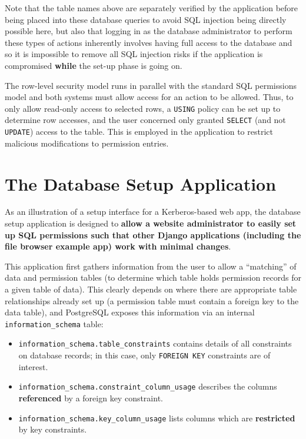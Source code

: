 \documentclass[12pt]{report}
\begin{document}
Note that the table names above are separately verified by the application before being placed into these database queries to avoid SQL injection being directly possible here, but also that logging in as the database administrator to perform these types of actions inherently involves having full access to the database and so it is impossible to remove all SQL injection risks if the application is compromised \textbf{while} the set-up phase is going on.

The row-level security model runs in parallel with the standard SQL permissions model and both systems must allow access for an action to be allowed. Thus, to only allow read-only access to selected rows, a \texttt{USING} policy can be set up to determine row accesses, and the user concerned only granted \texttt{SELECT} (and not \texttt{UPDATE}) access to the table. This is employed in the application to restrict malicious modifications to permission entries.

\section{The Database Setup Application}
\label{sec:database_setup_application}
As an illustration of a setup interface for a Kerberos-based web app, the database setup application is designed to \textbf{allow a website administrator to easily set up SQL permissions such that other Django applications (including the file browser example app) work with minimal changes}.

This application first gathers information from the user to allow a ``matching'' of data and permission tables (to determine which table holds permission records for a given table of data). This clearly depends on where there are appropriate table relationships already set up (a permission table must contain a foreign key to the data table), and PostgreSQL exposes this information via an internal \verb+information_schema+ table\cite{postgres-info_schema}:

\begin{itemize}
\item
  \verb+information_schema.table_constraints+ contains details of all constraints on database records; in this case, only \texttt{FOREIGN KEY} constraints are of interest.
\item
  \verb+information_schema.constraint_column_usage+ describes the columns \textbf{referenced} by a foreign key constraint.
\item
  \verb+information_schema.key_column_usage+ lists columns which are \textbf{restricted} by key constraints.
\end{itemize}
\end{document}
